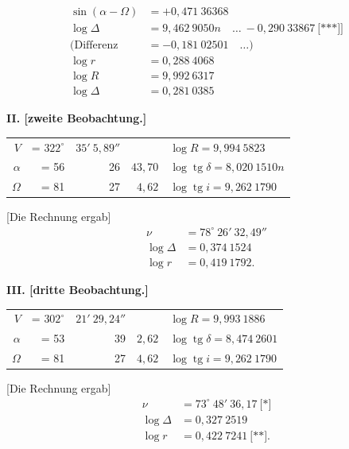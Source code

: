 \documentclass[12pt,a4paper]{article}
\DeclareMathOperator{\tg}{tg}
\theoremstyle{plain}
\theoremstyle{definition}
\theoremstyle{remark}
\begin{document}
\begin{align*}
\sin(\alpha - \Omega) &= +0{,}471\ 36368 \\
\log\Delta &= 9{,}462\ 9050n\quad \dots\ -0{,}290\ 33867\ \text{[***]]} \\
\text{(Differenz} &= -0{,}181\ 02501\quad \dots) \\
\log r &= 0{,}288\ 4068 \\
\log R &= 9{,}992\ 6317 \\
\log\Delta &= 0{,}281\ 0385
\end{align*}

\newpage

\noindent\textbf{II. [zweite Beobachtung.]}
\begin{center}
\begin{tabular}{r@{\quad}r@{\quad}r@{\quad}r@{\quad}l}
$V$ &= $322^\circ$ & $35'\ 5{,}89''$ && $\log R = 9{,}994\ 5823$ \\
$\alpha$ &= 56 & 26 & $43{,}70$ & $\log \tg\delta = 8{,}020\ 1510n$ \\
$\Omega$ &= 81 & 27 & $4{,}62$ & $\log \tg i = 9{,}262\ 1790$
\end{tabular}
\end{center}

[Die Rechnung ergab]
\begin{align*}
\nu &= 78^\circ\ 26'\ 32{,}49'' \\
\log\Delta &= 0{,}374\ 1524 \\
\log r &= 0{,}419\ 1792.
\end{align*}

\medskip

\noindent\textbf{III. [dritte Beobachtung.]}
\begin{center}
\begin{tabular}{r@{\quad}r@{\quad}r@{\quad}r@{\quad}l}
$V$ &= $302^\circ$ & $21'\ 29{,}24''$ && $\log R = 9{,}993\ 1886$ \\
$\alpha$ &= 53 & 39 & $2{,}62$ & $\log \tg\delta = 8{,}474\ 2601$ \\
$\Omega$ &= 81 & 27 & $4{,}62$ & $\log \tg i = 9{,}262\ 1790$
\end{tabular}
\end{center}

[Die Rechnung ergab]
\begin{align*}
\nu &= 73^\circ\ 48'\ 36{,}17\ \text{[*]} \\
\log\Delta &= 0{,}327\ 2519 \\
\log r &= 0{,}422\ 7241\ \text{[**]}.
\end{align*}
\end{document}
